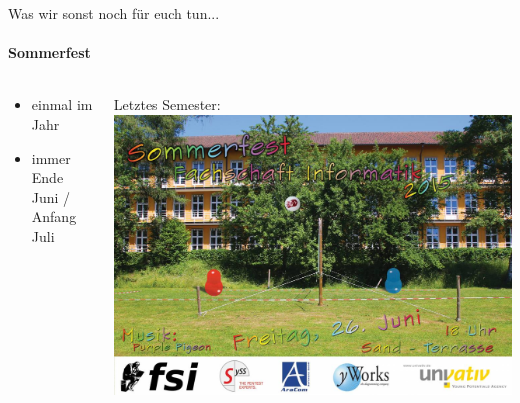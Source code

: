 \documentclass{beamer}
\begin{document}

	\begin{frame}{Was wir sonst noch für euch tun...}
	\framesubtitle{Sommerfest}
		\begin{columns}
			\begin{column}{.4\linewidth}
				\begin{itemize}
					\item einmal im Jahr
					\item immer Ende Juni / Anfang Juli
				\end{itemize}
			\end{column}
			\begin{column}{.7\linewidth}
				Letztes Semester:\vspace*{2mm}\\
				\includegraphics[width=\linewidth]{sf15.jpg}
			\end{column}
		\end{columns}
	\end{frame}
	
\end{document}
